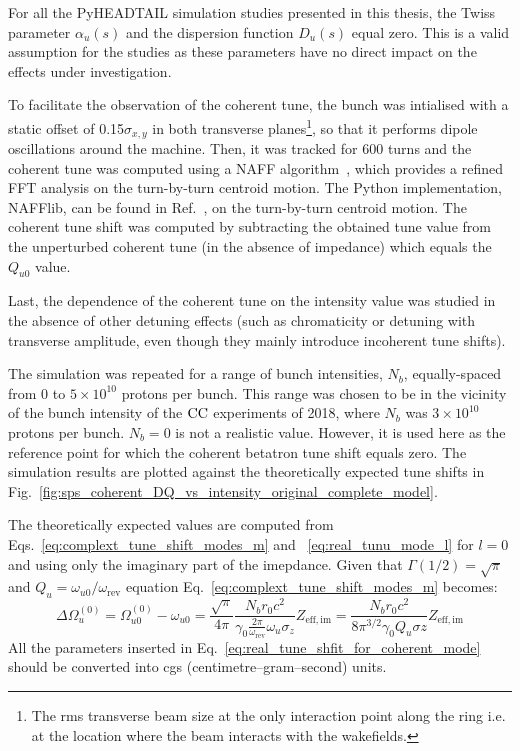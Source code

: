 For all the PyHEADTAIL simulation studies presented in this thesis, the Twiss parameter $\alpha_u(s)$ and the dispersion function $D_u(s)$ equal zero. This is a valid assumption for the studies as these parameters have no direct impact on the effects under investigation.

To facilitate the observation of the coherent tune, the bunch was intialised with a static offset of 0.15$\sigma_{x,y}$ in both transverse planes\footnote{The rms transverse beam size at the only interaction point along the ring i.e. at the location where the beam interacts with the wakefields.}, so that it performs dipole oscillations around the machine. Then, it was tracked for 600 turns and the coherent tune was computed using a NAFF algorithm~\cite{LASKAR1990266, Kostoglou:2289645}, which provides a refined FFT analysis on the turn-by-turn centroid motion.  The Python implementation, NAFFlib, can be found in Ref.~\cite{nafflib_repository}, on the turn-by-turn centroid motion. The coherent tune shift was computed by subtracting the obtained tune value from the unperturbed coherent tune (in the absence of impedance) which equals the $Q_{u0}$ value.

Last, the dependence of the coherent tune on the intensity value was studied in the absence of other detuning effects (such as chromaticity or detuning with transverse amplitude, even though they mainly introduce incoherent tune shifts). %

The simulation was repeated for a range of bunch intensities, $N_b$, equally-spaced from 0 to $5 \times 10^{10}$ protons per bunch. This range was chosen to be in the vicinity of the bunch intensity of the ${\mathrm{CC}}$ experiments of 2018, where $N_b$ was $3\times 10^{10}$ protons per bunch. $N_b=0$ is not a realistic value. However, it is used here as the reference point for which the coherent betatron tune shift equals zero. The simulation results are plotted against the theoretically expected tune shifts in Fig.~\ref{fig:sps_coherent_DQ_vs_intensity_original_complete_model}.

The theoretically expected values are computed from Eqs.~\eqref{eq:complext_tune_shift_modes_m} and ~\eqref{eq:real_tunu_mode_l} for $l=0$ and using only the imaginary part of the imepdance. Given that $\Gamma(1/2)=\sqrt{\pi}$ and $Q_u = \omega_{u0}/\omega_\mathrm{rev}$ equation Eq.~\eqref{eq:complext_tune_shift_modes_m} becomes:
\begin{equation}\label{eq:real_tune_shfit_for_coherent_mode}
    \Delta \Omega_u^{(0)} =  \Omega_{u0}^{(0)} - \omega_{u0} = \frac{\sqrt{\pi}}{4 \pi}\frac{N_b r_0 c^2}{\gamma_0 \frac{2\pi}{\omega_\mathrm{rev}}\omega_u \sigma_z} Z_\mathrm{eff, im} = \frac{N_b r_0 c^2}{8 \pi^{3/2} \gamma_0 Q_u \sigma z}Z_\mathrm{eff, im}
\end{equation}
All the parameters inserted in Eq.~\eqref{eq:real_tune_shfit_for_coherent_mode} should be converted into cgs (centimetre–gram–second) units.

